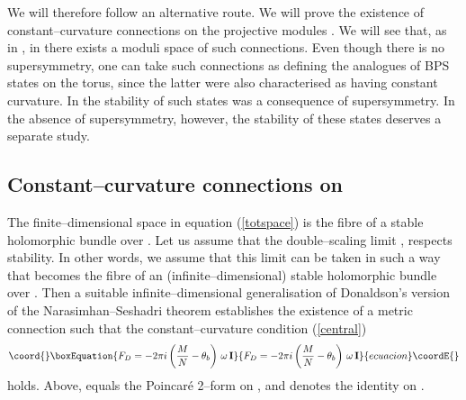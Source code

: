 \documentclass[a4paper,a4paper]{article}
\begin{document}
We will therefore follow an alternative route. We will prove the existence 
of constant--curvature connections on the projective modules \coordHE{}. We 
will see that, as in \coordHE{}, in \coordHE{} there exists a moduli space of 
such connections. Even though there is no supersymmetry, one can take such 
connections as defining the \coordHE{} analogues of BPS states on the torus, 
since the latter were also characterised as having constant curvature.
In \coordHE{} the stability of such states was a consequence of supersymmetry.
In the absence of supersymmetry, however, the stability of these states deserves 
a separate study. 

\subsection{Constant--curvature connections on \coordHE{}}\label{cccon}  
  
The finite--dimensional space \coordHE{} in equation (\ref{totspace})
is the fibre of a stable holomorphic bundle over \myHighlight{$\Sigma$}\coordHE{}. Let us 
assume that the double--scaling limit \coordHE{}, \coordHE{} 
respects stability. In other words, we assume that this limit can 
be taken in such a way that \coordHE{} becomes the fibre of an 
(infinite--dimensional) stable holomorphic bundle over \myHighlight{$\Sigma$}\coordHE{}.
Then a suitable infinite--dimensional generalisation of Donaldson's version 
of the Narasimhan--Seshadri theorem establishes the existence of a metric 
connection \coordHE{} such that the constant--curvature condition (\ref{central}) 
\begin{equation}\coord{}\boxEquation{  
F_D=-2\pi i \left({M\over N}-\theta_b\right)\,\omega\,{\bf  I} 
\label{constanze}
}{  
F_D=-2\pi i \left({M\over N}-\theta_b\right)\,\omega\,{\bf  I} 
}{ecuacion}\coordE{}\end{equation}  
holds. Above, \myHighlight{$\omega$}\coordHE{} equals the Poincar\'e 2--form 
\coordHE{} on \coordHE{}, 
and \coordHE{} denotes the identity on \coordHE{}.
\end{document}
